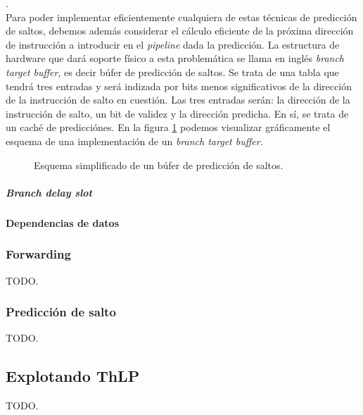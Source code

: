 \cite[sección, 3.3]{caaqa}.\\
Para poder implementar eficientemente cualquiera de estas técnicas de 
predicción de saltos, debemos además considerar el cálculo eficiente de la 
próxima dirección de instrucción a introducir en el \emph{pipeline} dada la 
predicción. La estructura de hardware que dará soporte físico a esta 
problemática se llama en inglés \emph{branch target buffer}, es decir búfer de 
predicción de saltos. Se trata de una tabla que tendrá tres entradas y será 
indizada por bits menos significativos de la dirección de la instrucción de 
salto en cuestión. Las tres entradas serán: la dirección de la instrucción de 
salto, un bit de validez y la dirección predicha. En sí, se trata de un caché 
de predicciónes. En la figura \ref{fig:C02-btb} podemos visualizar gráficamente 
el esquema de una implementación de un \emph{branch target buffer}.
\begin{figure}
  \centering
  \resizebox{\textwidth}{!}{}
  \captionsetup{justification=centering}
  \caption{Esquema simplificado de un búfer de 
predicción de saltos.}
  \label{fig:C02-btb}
\end{figure}

\subparagraph{Branch delay slot}

\paragraph{Dependencias de datos}
\label{par:optimizations-ilp-pipeline-data_dependencies}


\subsubsection{Forwarding}
\label{subsubsec:optimizations-ilp-forwarding}

TODO.

\subsubsection{Predicción de salto}
\label{subsubsec:optimizations-ilp-branch_prediction}

TODO.

\subsection{Explotando ThLP}
\label{subsec:optimizations-thlp}

TODO.











